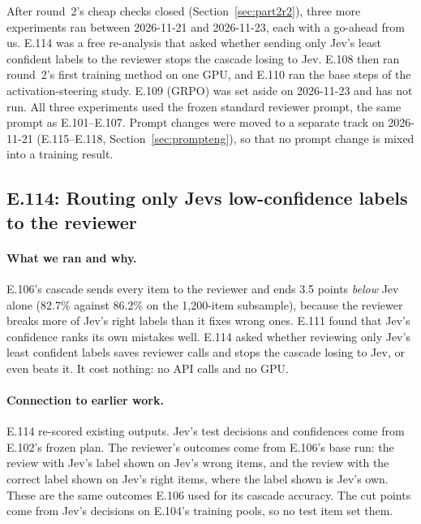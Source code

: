 \documentclass[11pt]{article}
\renewcommand{\_}{\origunderscore\allowbreak}
\begin{document}
After round~2's cheap checks closed (Section~\ref{sec:part2r2}), three more experiments ran between 2026-11-21 and 2026-11-23, each with a go-ahead from us. E.114 was a free re-analysis that asked whether sending only Jev's least confident labels to the reviewer stops the cascade losing to Jev. E.108 then ran round~2's first training method on one GPU, and E.110 ran the base steps of the activation-steering study. E.109 (GRPO) was set aside on 2026-11-23 and has not run. All three experiments used the frozen standard reviewer prompt, the same prompt as E.101--E.107. Prompt changes were moved to a separate track on 2026-11-21 (E.115--E.118, Section~\ref{sec:prompteng}), so that no prompt change is mixed into a training result.

\subsection{E.114: Routing only Jev\textquotesingle s low-confidence labels to the reviewer}\label{sec:e114}

\paragraph{What we ran and why.}
E.106's cascade sends every item to the reviewer and ends 3.5 points \emph{below} Jev alone (82.7\% against 86.2\% on the 1{,}200-item subsample), because the reviewer breaks more of Jev's right labels than it fixes wrong ones. E.111 found that Jev's confidence ranks its own mistakes well. E.114 asked whether reviewing only Jev's least confident labels saves reviewer calls and stops the cascade losing to Jev, or even beats it. It cost nothing: no API calls and no GPU.

\paragraph{Connection to earlier work.}
E.114 re-scored existing outputs. Jev's test decisions and confidences come from E.102's frozen plan. The reviewer's outcomes come from E.106's base run: the review with Jev's label shown on Jev's wrong items, and the review with the correct label shown on Jev's right items, where the label shown is Jev's own. These are the same outcomes E.106 used for its cascade accuracy. The cut points come from Jev's decisions on E.104's training pools, so no test item set them.
\end{document}
